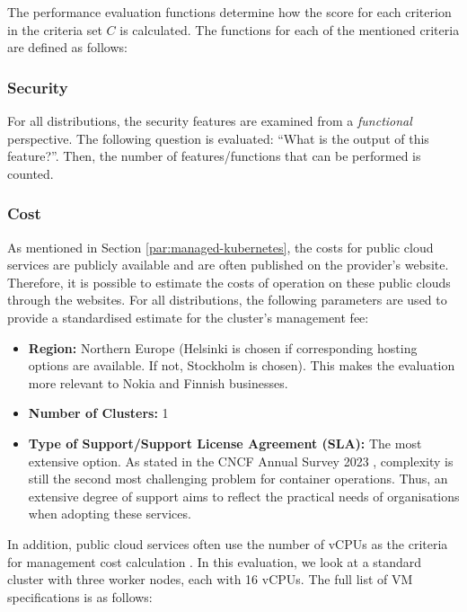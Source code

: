The performance evaluation functions determine how the score for
each criterion in the criteria set \(C\) is calculated. The functions for each
of the mentioned criteria are defined as follows:

\subsubsection{Security}\label{security}

For all distributions, the security features are examined from a
\emph{functional} perspective. The following question is
evaluated: ``What is the output of this feature?''. Then, the number of features/functions that can be performed is counted.

\subsubsection{Cost}\label{cost}

As mentioned in Section \ref{par:managed-kubernetes}, the costs for public
cloud services are publicly available and are often published on the
provider's website. Therefore, it is possible to estimate the costs of operation on these public clouds through the websites. For all distributions, the following parameters are
used to provide a standardised estimate for the cluster's management
fee:

\begin{itemize}
\tightlist
\item
  \textbf{Region:} Northern Europe (Helsinki is chosen if corresponding hosting options are available. If not, Stockholm is chosen). This makes the
  evaluation more relevant to Nokia and Finnish businesses.
\item
  \textbf{Number of Clusters:} 1
\item
  \textbf{Type of Support/Support License Agreement (SLA):} The most
  extensive option. As stated in the CNCF Annual Survey 2023
  \cite{CNCFAnnualSurvey2024}, complexity is still the second most
  challenging problem for container operations. Thus, an extensive
  degree of support aims to reflect the practical needs of organisations
  when adopting these services.
\end{itemize}

In addition, public cloud services often use the number of vCPUs as the criteria for
management cost calculation
\cite{RedHatOpenShiftc,PricingGoogleKubernetes}. In this evaluation, we
look at a standard cluster with three worker nodes, each with 16 vCPUs. The
full list of VM specifications is as follows:

